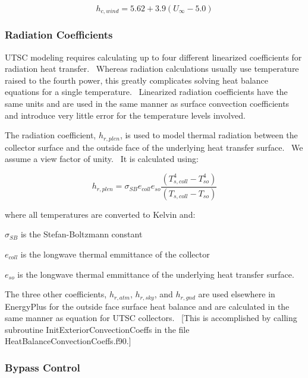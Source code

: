 \begin{equation}
{h_{c,wind}} = 5.62 + 3.9({U_\infty } - 5.0)
\end{equation}

\subsubsection{Radiation Coefficients}\label{radiation-coefficients-000}

UTSC modeling requires calculating up to four different linearized coefficients for radiation heat transfer.~ Whereas radiation calculations usually use temperature raised to the fourth power, this greatly complicates solving heat balance equations for a single temperature.~ Linearized radiation coefficients have the same units and are used in the same manner as surface convection coefficients and introduce very little error for the temperature levels involved.

The radiation coefficient, \({h_{r,plen}}\), is used to model thermal radiation between the collector surface and the outside face of the underlying heat transfer surface.~ We assume a view factor of unity.~ It is calculated using:

\begin{equation}
{h_{r,plen}} = {\sigma_{SB}}{e_{coll}}{e_{so}}\frac{{\left( {T_{s,coll}^4 - T_{so}^4} \right)}}{{\left( {{T_{s,coll}} - {T_{so}}} \right)}}
\end{equation}

where all temperatures are converted to Kelvin and:

\({\sigma_{SB}}\) is the Stefan-Boltzmann constant

\({e_{coll}}\) is the longwave thermal emmittance of the collector

\({e_{so}}\) is the longwave thermal emmittance of the underlying heat transfer surface.

The three other coefficients, \({h_{r,atm}}\), \({h_{r,sky}}\), and \({h_{r,gnd}}\) are used elsewhere in EnergyPlus for the outside face surface heat balance and are calculated in the same manner as equation for UTSC collectors.~ {[}This is accomplished by calling subroutine InitExteriorConvectionCoeffs in the file HeatBalanceConvectionCoeffs.f90.{]}

\subsubsection{Bypass Control}\label{bypass-control}

